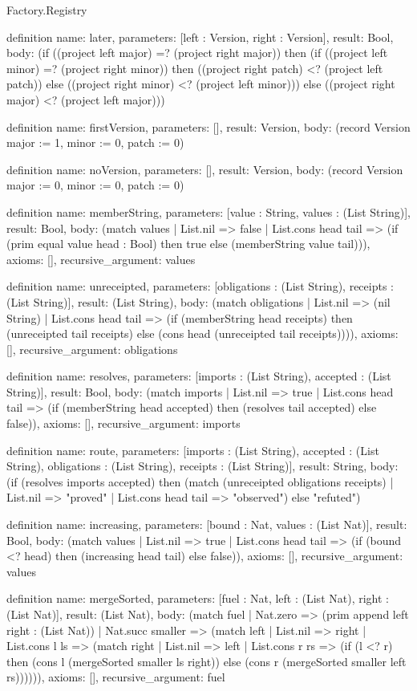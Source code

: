 \begin{lexlean}{Factory.Registry}
\begin{semanticmodule}
definition{
  name: later,
  parameters: [left : Version, right : Version],
  result: Bool,
  body: (if ((project left major) =? (project right major)) then (if ((project left minor) =? (project right minor)) then ((project right patch) <? (project left patch)) else ((project right minor) <? (project left minor))) else ((project right major) <? (project left major)))
}

definition{
  name: firstVersion,
  parameters: [],
  result: Version,
  body: (record Version {major := 1, minor := 0, patch := 0})
}

definition{
  name: noVersion,
  parameters: [],
  result: Version,
  body: (record Version {major := 0, minor := 0, patch := 0})
}

definition{
  name: memberString,
  parameters: [value : String, values : (List String)],
  result: Bool,
  body: (match values
    | List.nil => false
    | List.cons head tail => (if (prim equal value head : Bool) then true else (memberString value tail))),
  axioms: [],
  recursive_argument: values
}

definition{
  name: unreceipted,
  parameters: [obligations : (List String), receipts : (List String)],
  result: (List String),
  body: (match obligations
    | List.nil => (nil String)
    | List.cons head tail => (if (memberString head receipts) then (unreceipted tail receipts) else (cons head (unreceipted tail receipts)))),
  axioms: [],
  recursive_argument: obligations
}

definition{
  name: resolves,
  parameters: [imports : (List String), accepted : (List String)],
  result: Bool,
  body: (match imports
    | List.nil => true
    | List.cons head tail => (if (memberString head accepted) then (resolves tail accepted) else false)),
  axioms: [],
  recursive_argument: imports
}

definition{
  name: route,
  parameters: [imports : (List String), accepted : (List String), obligations : (List String), receipts : (List String)],
  result: String,
  body: (if (resolves imports accepted) then (match (unreceipted obligations receipts)
    | List.nil => "proved"
    | List.cons head tail => "observed") else "refuted")
}

definition{
  name: increasing,
  parameters: [bound : Nat, values : (List Nat)],
  result: Bool,
  body: (match values
    | List.nil => true
    | List.cons head tail => (if (bound <? head) then (increasing head tail) else false)),
  axioms: [],
  recursive_argument: values
}

definition{
  name: mergeSorted,
  parameters: [fuel : Nat, left : (List Nat), right : (List Nat)],
  result: (List Nat),
  body: (match fuel
    | Nat.zero => (prim append left right : (List Nat))
    | Nat.succ smaller => (match left
      | List.nil => right
      | List.cons l ls => (match right
        | List.nil => left
        | List.cons r rs => (if (l <? r) then (cons l (mergeSorted smaller ls right)) else (cons r (mergeSorted smaller left rs)))))),
  axioms: [],
  recursive_argument: fuel
}


\end{semanticmodule}
\end{lexlean}
